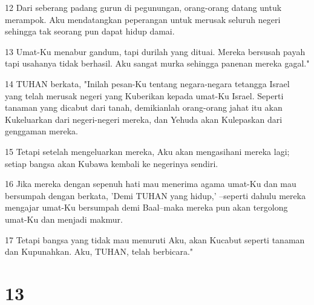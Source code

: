\par 12 Dari seberang padang gurun di pegunungan, orang-orang datang untuk merampok. Aku mendatangkan peperangan untuk merusak seluruh negeri sehingga tak seorang pun dapat hidup damai.
\par 13 Umat-Ku menabur gandum, tapi durilah yang dituai. Mereka bersusah payah tapi usahanya tidak berhasil. Aku sangat murka sehingga panenan mereka gagal."
\par 14 TUHAN berkata, "Inilah pesan-Ku tentang negara-negara tetangga Israel yang telah merusak negeri yang Kuberikan kepada umat-Ku Israel. Seperti tanaman yang dicabut dari tanah, demikianlah orang-orang jahat itu akan Kukeluarkan dari negeri-negeri mereka, dan Yehuda akan Kulepaskan dari genggaman mereka.
\par 15 Tetapi setelah mengeluarkan mereka, Aku akan mengasihani mereka lagi; setiap bangsa akan Kubawa kembali ke negerinya sendiri.
\par 16 Jika mereka dengan sepenuh hati mau menerima agama umat-Ku dan mau bersumpah dengan berkata, 'Demi TUHAN yang hidup,' --seperti dahulu mereka mengajar umat-Ku bersumpah demi Baal--maka mereka pun akan tergolong umat-Ku dan menjadi makmur.
\par 17 Tetapi bangsa yang tidak mau menuruti Aku, akan Kucabut seperti tanaman dan Kupunahkan. Aku, TUHAN, telah berbicara."

\chapter{13}

